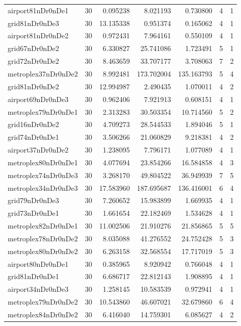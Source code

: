 \documentclass[../../../thesis.tex]{subfiles}
\begin{document}
\begin{longtable}{|l|r|r|r|r|r|r|}
airport81nDr0nDe1 & 30 & 0.095238 & 8.021193 & 0.730800 & 4 & 1 \\
grid81nDr0nDe3 & 30 & 13.135338 & 0.951374 & 0.165062 & 4 & 1 \\
airport81nDr0nDe2 & 30 & 0.972431 & 7.964161 & 0.550109 & 4 & 1 \\
grid67nDr0nDe2 & 30 & 6.330827 & 25.741086 & 1.723491 & 5 & 1 \\
grid72nDr0nDe2 & 30 & 8.463659 & 33.707177 & 3.708063 & 7 & 2 \\
metroplex37nDr0nDe2 & 30 & 8.992481 & 173.702004 & 135.163793 & 5 & 4 \\
grid81nDr0nDe2 & 30 & 12.994987 & 2.490435 & 1.070011 & 4 & 2 \\
airport69nDr0nDe3 & 30 & 0.962406 & 7.921913 & 0.608151 & 4 & 1 \\
metroplex79nDr0nDe1 & 30 & 2.313283 & 30.503354 & 10.714560 & 5 & 2 \\
grid16nDr0nDe2 & 30 & 4.709273 & 28.544533 & 1.894046 & 5 & 1 \\
grid74nDr0nDe1 & 30 & 3.506266 & 21.060829 & 9.218381 & 4 & 2 \\
airport37nDr0nDe2 & 30 & 1.238095 & 7.796171 & 1.077089 & 4 & 1 \\
metroplex80nDr0nDe1 & 30 & 4.077694 & 23.854266 & 16.584858 & 4 & 3 \\
metroplex74nDr0nDe3 & 30 & 3.268170 & 49.804522 & 36.949939 & 7 & 5 \\
metroplex34nDr0nDe3 & 30 & 17.583960 & 187.695687 & 136.416001 & 6 & 4 \\
grid79nDr0nDe3 & 30 & 7.260652 & 15.983899 & 1.669935 & 4 & 1 \\
grid73nDr0nDe1 & 30 & 1.661654 & 22.182469 & 1.534628 & 4 & 1 \\
metroplex82nDr0nDe1 & 30 & 11.002506 & 21.910276 & 21.856865 & 5 & 5 \\
metroplex78nDr0nDe2 & 30 & 8.035088 & 41.276552 & 24.752428 & 5 & 3 \\
metroplex80nDr0nDe2 & 30 & 6.263158 & 32.568554 & 17.717019 & 5 & 3 \\
airport80nDr0nDe1 & 30 & 0.385965 & 8.920942 & 0.766048 & 4 & 1 \\
grid81nDr0nDe1 & 30 & 6.686717 & 22.812143 & 1.908895 & 4 & 1 \\
airport34nDr0nDe3 & 30 & 1.258145 & 10.583539 & 0.972941 & 4 & 1 \\
metroplex79nDr0nDe2 & 30 & 10.543860 & 46.607021 & 32.679860 & 6 & 4 \\
metroplex84nDr0nDe2 & 30 & 6.416040 & 14.759301 & 6.085627 & 4 & 2 \\

\end{longtable}
\end{document}
